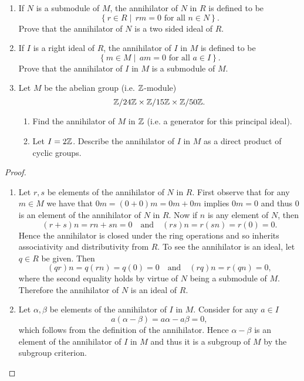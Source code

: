 \documentclass[10pt]{amsart}
\begin{document}
\begin{thm}
  \label{Ex4}
  \begin{enumerate}
  \item
    If $N$ is a submodule of $M$, the annihilator of $N$ in $R$ is defined to be 
    $$\left\{r \in R \mid\, rm=0 \text{ for all } n \in N\right\}.$$
    Prove that the annihilator of $N$ is a two sided ideal of $R$.
  \item
    If $I$ is a right ideal of $R$, the annihilator of $I$ in $M$ is defined to be 
    $$\left\{m \in M \mid\, am=0 \text{ for all } a \in I\right\}.$$
    Prove that the annihilator of $I$ in $M$ is a submodule of $M$.
  \item
    Let $M$ be the abelian group (i.e. $\mathbb{Z}$-module)
    $$\mathbb{Z}/24\mathbb{Z} \times \mathbb{Z}/15\mathbb{Z} \times \mathbb{Z}/50\mathbb{Z}.$$
    \begin{enumerate}
    \item
      Find the annihilator of $M$ in $\mathbb{Z}$ (i.e. a generator for this principal ideal).
    \item
      Let $I = 2\mathbb{Z}$.
      Describe the annihilator of $I$ in $M$ as a direct product of cyclic groups.
    \end{enumerate}
  \end{enumerate}
  
  \begin{proof}
    \begin{enumerate}
    \item
      Let $r,s$ be elements of the annihilator of $N$ in $R$.
      First observe that for any $m \in M$ we have that $0m = (0+0)m = 0m + 0m$ implies $0m = 0$ and thus  $0$ is an element of the annihilator of $N$ in $R$.
      Now if $n$ is any element of $N$, then 
      $$(r+s)n = rn + sn = 0 \quad \text{and} \quad (rs)n = r(sn) = r(0) = 0.$$
      Hence the annihilator is closed under the ring operations and so inherits associativity and distributivity from $R$.
      To see the annihilator is an ideal, let $q \in R$ be given.
      Then 
      $$(qr)n = q(rn) = q(0) = 0 \quad \text{and} \quad (rq)n = r(qn) = 0,$$
      where the second equality holds by virtue of $N$ being a submodule of $M$.
      Therefore the annihilator of $N$ is an ideal of $R$.
    \item
      Let $\alpha,\beta$ be elements of the annihilator of $I$ in $M$.  Consider for any $a \in I$ 
      $$a(\alpha - \beta) = a\alpha - a\beta = 0,$$
      which follows from the definition of the annihilator.
      Hence $\alpha - \beta$ is an element of the annihilator of $I$ in $M$ and thus it is a subgroup of $M$ by the subgroup criterion.
      

\end{enumerate}
\end{proof}
\end{thm}
\end{document}
